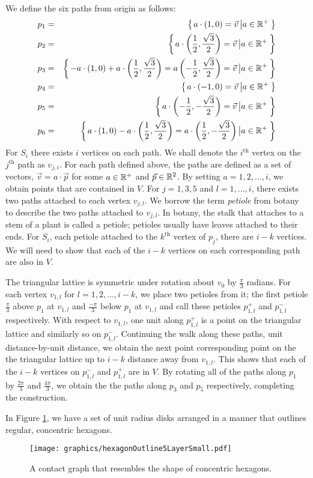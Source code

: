 We define the six paths from origin as follows:      
\begin{eqnarray*}
p_1 &=& {\left\lbrace \left. a\cdot\left( 1,0 \right) = \vec{v} \left\vert a \in {\mathbb{R}}^+ \right.\right.\right\rbrace }\\
p_2 &=& {\left\lbrace \left. a\cdot\left( \frac{1}{2},\frac{\sqrt{3}}{2} \right) = \vec{v} \left\vert a \in {\mathbb{R}}^+ \right.\right.\right\rbrace }\\
p_3 &=& {\left\lbrace \left. -a\cdot \left( 1,0 \right) + a \cdot \left( \frac{1}{2},\frac{\sqrt{3}}{2} \right) = a\left( -\frac{1}{2},\frac{\sqrt{3}}{2} \right) = \vec{v} \left\vert a \in {\mathbb{R}}^+ \right.\right.\right\rbrace }\\
p_4 &=& {\left\lbrace \left. a \cdot \left( -1,0 \right) = \vec{v} \left\vert a \in {\mathbb{R}}^+ \right.\right.\right\rbrace }\\
p_5 &=& {\left\lbrace \left. a \cdot \left( -\frac{1}{2},-\frac{\sqrt{3}}{2} \right)  = \vec{v} \left\vert a \in {\mathbb{R}}^+ \right.\right.\right\rbrace }\\
p_6 &=& {\left\lbrace \left.  a\cdot \left( 1,0 \right) - a \cdot \left( \frac{1}{2},\frac{\sqrt{3}}{2} \right)= a \cdot \left( \frac{1}{2}, -\frac{\sqrt{3}}{2} \right) \left\vert a \in {\mathbb{R}}^+ \right.\right.\right\rbrace } 
\end{eqnarray*}
For $S_i$ there exists $i$ vertices on each path.  
We shall denote the $i^\text{th}$ vertex on the $j^\text{th}$ path as $v_{j,i}$.  
For each path defined above, the paths are defined as a set of vectors, $\vec{v} = a \cdot \vec{p}$  for some $a \in {\mathbb{R}}^+$ and $\vec{p} \in {\mathbb{R}}^2$.  
By setting $a = 1,2,\dots, i$, we obtain points that are contained in $V$.  
For $j = 1,3,5$ and $l = 1,..., i$, there exists two paths attached to each vertex $v_{j,l}$.  
We borrow the term \textit{petiole} from botany to describe the two paths attached to $v_{j,l}$.  
In botany, the stalk that attaches to a stem of a plant is called a petiole; petioles usually have leaves attached to their ends.  
For $S_i$, each petiole attached to the $k^\text{th}$ vertex of $p_j$, there are $i-k$ vertices.  
We will need to show that each of the $i-k$ vertices on each corresponding path are also in $V$.  

The triangular lattice is symmetric under rotation about $v_0$ by $\frac{\pi}{3}$ radians.  
For each vertex $v_{1,l}$ for $l=1,2,\dots, i-k$, we place two petioles from it; the first petiole $\frac{\pi}{3}$ above $p_1$ at $v_{1,l}$ and $\frac{-\pi}{3}$ below $p_1$ at $v_{1,l}$ and call these petioles $p_{1,l}^+$ and $p_{1,l}^-$ respectively.  
With respect to $v_{1,l}$, one unit along $p_{1,l}^+$ is a point on the triangular lattice and similarly so on $p_{1,l}^-$.  
Continuing the walk along these paths, unit distance-by-unit distance, we obtain the next point corresponding point on the the triangular lattice up to $i-k$ distance away from $v_{1,l}$.  
This shows that each of the $i-k$ vertices on $p_{1,l}^-$ and $p_{1,l}^+$ are in $V$.  
By rotating all of the paths along $p_1$ by $\frac{2\pi}{3}$ and $\frac{4\pi}{3}$, we obtain the the paths along $p_3$ and $p_5$ respectively, completing the construction.

In Figure \ref{fig:hexagonOutline5LayerSmall.pdf}, we have a set of unit radius disks arranged in a manner that outlines regular, concentric hexagons.
\begin{figure}[!htbp]
\begin{center}
\texttt{[image: graphics/hexagonOutline5LayerSmall.pdf]}
\caption{A contact graph that resembles the shape of concentric hexagons.}\label{fig:hexagonOutline5LayerSmall.pdf}
\end{center}
\end{figure}